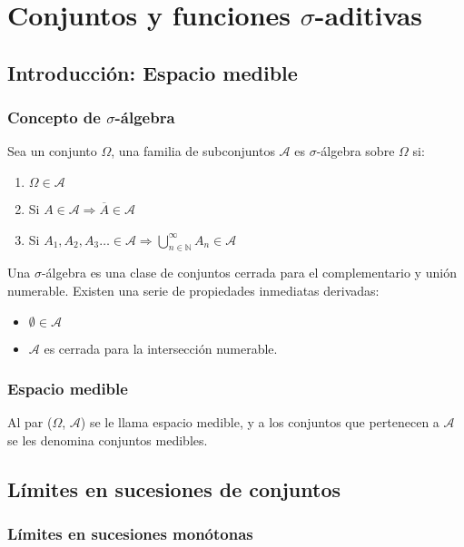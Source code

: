 
\chapter{Conjuntos y funciones $\sigma$-aditivas}

\section{Introducción: Espacio medible}

\subsection*{Concepto de $\sigma$-álgebra}
Sea un conjunto $\Omega$, una
familia de subconjuntos $\mathcal{A}$ es $\sigma$-álgebra sobre $\Omega$ si: 
\begin{enumerate}
\item $\Omega \in \mathcal{A}$
\item Si $A \in \mathcal{A} \Rightarrow \overline{A} \in \mathcal{A}$
\item Si $A_1, A_2, A_3\ldots \in \mathcal{A} \Rightarrow \displaystyle \bigcup_{n \in \mathbb{N}}^{\infty} A_n \in \mathcal{A}$
\end{enumerate}
Una $\sigma$-álgebra es una clase de conjuntos cerrada para el complementario y unión numerable. Existen una serie de propiedades inmediatas derivadas:
\begin{itemize}
  \item $\emptyset \in \mathcal{A}$
  \item $\mathcal{A}$ es cerrada para la  intersección numerable.
\end{itemize}

\subsection*{Espacio medible}

Al par ($\Omega$, $\mathcal{A}$) se le llama espacio medible, y a los conjuntos que pertenecen a $\mathcal{A}$ se les denomina conjuntos medibles.

\section{Límites en sucesiones de conjuntos}

\subsection{Límites en sucesiones monótonas}

